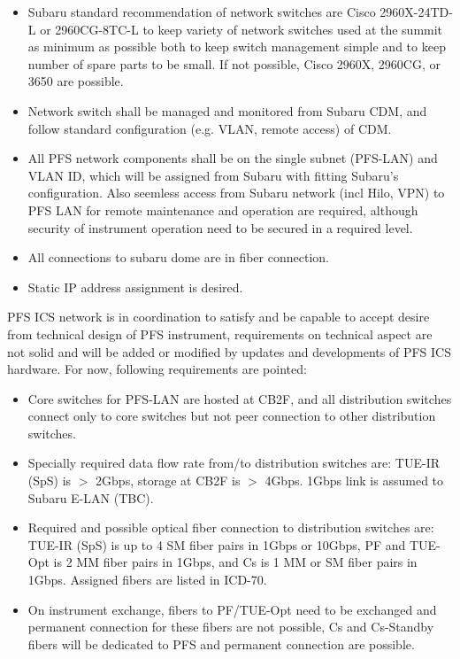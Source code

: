 \documentclass[a4paper,notitlepage]{article}
\begin{document}
\begin{itemize}
  \item Subaru standard recommendation of network switches are Cisco 
    2960X-24TD-L or 2960CG-8TC-L to keep variety of network switches used 
    at the summit as minimum as possible both to keep switch management simple 
    and to keep number of spare parts to be small. If not possible, Cisco 
    2960X, 2960CG, or 3650 are possible.
  \item Network switch shall be managed and monitored from Subaru CDM, and 
    follow standard configuration (e.g. VLAN, remote access) of CDM.
  \item All PFS network components shall be on the single subnet (PFS-LAN) and 
    VLAN ID, which will be assigned from Subaru with fitting Subaru's 
    configuration. Also seemless access from Subaru network (incl Hilo, VPN) 
    to PFS LAN for remote maintenance and operation are required, although 
    security of instrument operation need to be secured in a required level.
  \item All connections to subaru dome are in fiber connection. 
  \item Static IP address assignment is desired.
\end{itemize}

PFS ICS network is in coordination to satisfy and be capable to accept desire 
from technical design of PFS instrument, requirements on technical aspect are 
not solid and will be added or modified by updates and developments of PFS ICS 
hardware. For now, following requirements are pointed: 

\begin{itemize}
  \item Core switches for PFS-LAN are hosted at CB2F, and all distribution 
    switches connect only to core switches but not peer connection to other 
    distribution switches.
  \item Specially required data flow rate from/to distribution switches are: 
    TUE-IR (SpS) is $>$ 2Gbps, storage at CB2F is $>$ 4Gbps.
    1Gbps link is assumed to Subaru E-LAN (TBC).
  \item Required and possible optical fiber connection to distribution switches 
    are: TUE-IR (SpS) is up to 4 SM fiber pairs in 1Gbps or 10Gbps, PF and 
    TUE-Opt is 2 MM fiber pairs in 1Gbps, and Cs is 1 MM or SM fiber pairs in 
    1Gbps. Assigned fibers are listed in ICD-70.
  \item On instrument exchange, fibers to PF/TUE-Opt need to be exchanged and 
    permanent connection for these fibers are not possible, Cs and Cs-Standby 
    fibers will be dedicated to PFS and permanent connection are possible.
\end{itemize}
\end{document}
